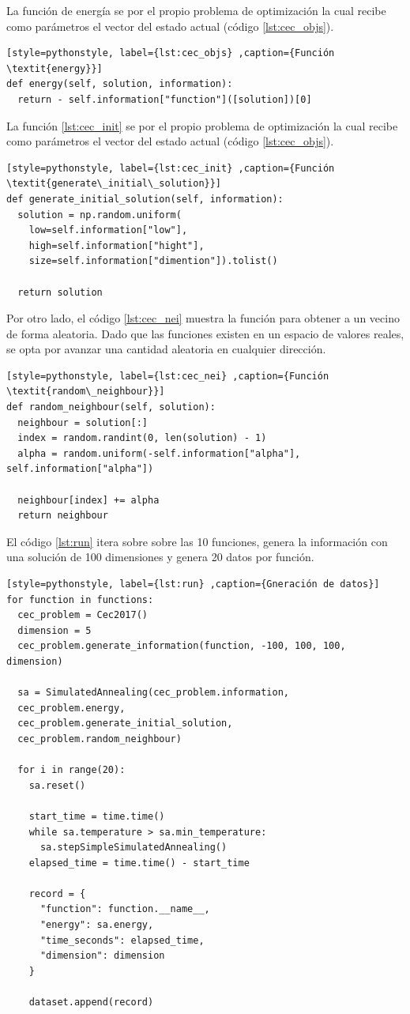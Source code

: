\documentclass[12pt,twoside]{article}
\begin{document}
La función de energía se  por el propio problema de optimización la cual recibe como parámetros el vector del estado actual (código \ref{lst:cec_objs}).

\begin{lstlisting}[style=pythonstyle, label={lst:cec_objs} ,caption={Función \textit{energy}}]
def energy(self, solution, information):
  return - self.information["function"]([solution])[0]
\end{lstlisting}

La función \ref{lst:cec_init} se  por el propio problema de optimización la cual recibe como parámetros el vector del estado actual (código \ref{lst:cec_objs}).

\begin{lstlisting}[style=pythonstyle, label={lst:cec_init} ,caption={Función \textit{generate\_initial\_solution}}]
def generate_initial_solution(self, information):
  solution = np.random.uniform(
  	low=self.information["low"],
  	high=self.information["hight"],
  	size=self.information["dimention"]).tolist()

  return solution
\end{lstlisting}

Por otro lado, el código \ref{lst:cec_nei} muestra la función para obtener a un vecino de forma aleatoria. Dado que las funciones existen en un espacio de valores reales, se opta por avanzar una cantidad aleatoria en cualquier dirección.

\begin{lstlisting}[style=pythonstyle, label={lst:cec_nei} ,caption={Función \textit{random\_neighbour}}]
def random_neighbour(self, solution):
  neighbour = solution[:]
  index = random.randint(0, len(solution) - 1)
  alpha = random.uniform(-self.information["alpha"], self.information["alpha"])

  neighbour[index] += alpha
  return neighbour
\end{lstlisting}

El código \ref{lst:run} itera sobre sobre las 10 funciones, genera la información con una solución de 100 dimensiones y genera 20 datos por función.

\begin{lstlisting}[style=pythonstyle, label={lst:run} ,caption={Gneración de datos}]
for function in functions:
  cec_problem = Cec2017()
  dimension = 5
  cec_problem.generate_information(function, -100, 100, 100, dimension)

  sa = SimulatedAnnealing(cec_problem.information, 
  cec_problem.energy, 
  cec_problem.generate_initial_solution, 
  cec_problem.random_neighbour)

  for i in range(20):
    sa.reset()

    start_time = time.time()
	while sa.temperature > sa.min_temperature:
	  sa.stepSimpleSimulatedAnnealing()
	elapsed_time = time.time() - start_time

	record = {
	  "function": function.__name__,
	  "energy": sa.energy,
	  "time_seconds": elapsed_time,
	  "dimension": dimension
	}

	dataset.append(record)
\end{lstlisting}
\end{document}
